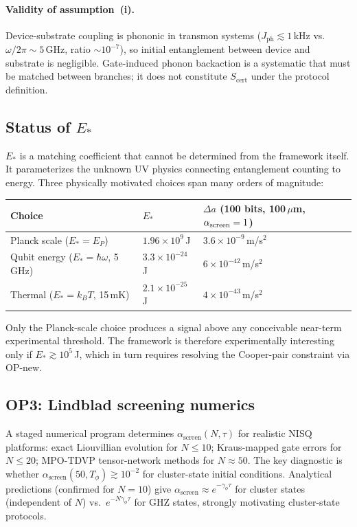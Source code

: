 \documentclass[11pt]{article}
\theoremstyle{plain}
\theoremstyle{definition}
\theoremstyle{remark}
\begin{document}
\paragraph{Validity of assumption~(i).}
Device-substrate coupling is phononic in transmon systems ($J_{\mathrm{ph}} \lesssim 1$\,kHz
vs.\ $\omega/2\pi \sim 5$\,GHz, ratio $\sim 10^{-7}$), so initial entanglement between device and
substrate is negligible.  Gate-induced phonon backaction is a systematic that must be matched
between branches; it does not constitute $S_{\mathrm{cert}}$ under the protocol definition.

\subsection{Status of $E_*$}

$E_*$ is a matching coefficient that cannot be determined from the framework itself.
It parameterizes the unknown UV physics connecting entanglement counting to energy.
Three physically motivated choices span many orders of magnitude:

\begin{center}\small
\begin{tabular}{@{}lll@{}}
\toprule
Choice & $E_*$ & $\Delta a$ (100 bits, 100\,$\mu$m, $\alpha_{\rm screen}=1$)\\
\midrule
Planck scale ($E_* = E_P$) & $1.96\times10^9$\,J & $3.6\times10^{-9}$\,m/s$^2$ \\
Qubit energy ($E_* = \hbar\omega$, 5\,GHz) & $3.3\times10^{-24}$\,J & $6\times10^{-42}$\,m/s$^2$ \\
Thermal ($E_* = k_BT$, 15\,mK) & $2.1\times10^{-25}$\,J & $4\times10^{-43}$\,m/s$^2$ \\
\bottomrule
\end{tabular}
\end{center}

Only the Planck-scale choice produces a signal above any conceivable near-term experimental
threshold.  The framework is therefore experimentally interesting only if $E_* \gtrsim 10^5$\,J,
which in turn requires resolving the Cooper-pair constraint via OP-new.

\subsection{OP3: Lindblad screening numerics}

A staged numerical program determines $\alpha_{\mathrm{screen}}(N,\tau)$ for realistic
NISQ platforms: exact Liouvillian evolution for $N \leq 10$; Kraus-mapped gate errors
for $N \leq 20$; MPO-TDVP tensor-network methods for $N \approx 50$.  The key diagnostic
is whether $\alpha_{\mathrm{screen}}(50, T_\phi) \gtrsim 10^{-2}$ for cluster-state initial
conditions.  Analytical predictions (confirmed for $N=10$) give $\alpha_{\mathrm{screen}}
\approx e^{-\gamma_\phi\tau}$ for cluster states (independent of $N$) vs.\ $e^{-N\gamma_\phi\tau}$
for GHZ states, strongly motivating cluster-state protocols.
\end{document}
